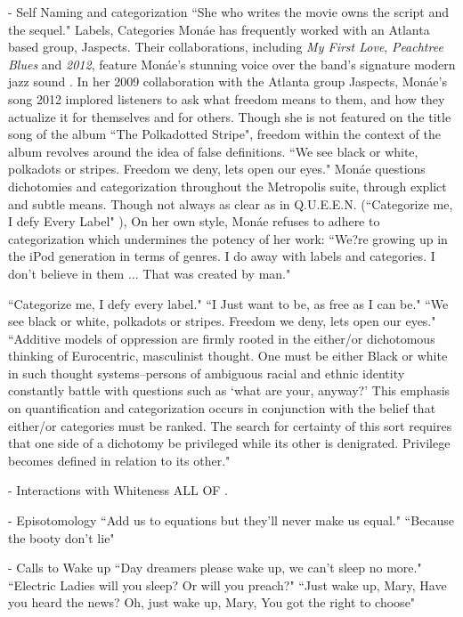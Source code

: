 \documentclass[a4paper, 11pt]{article} %
\begin{document}
- Self Naming and categorization
``She who writes the movie owns the script and the sequel." \cite{queen}
Labels, Categories
Mon\'ae has frequently worked with an Atlanta based group, Jaspects.
Their collaborations, including \emph{My First Love}, \emph{Peachtree Blues} and \emph{2012}, feature Mon\'ae's stunning voice over the band's signature modern jazz sound \cite{peachtreeblues} \cite{myfirstlove}.
In her 2009 collaboration with the Atlanta group Jaspects, Mon\'ae's song 2012 implored listeners to ask what freedom means to them, and how they actualize it for themselves and for others.
Though she is not featured on the title song of the album ``The Polkadotted Stripe", freedom within the context of the album revolves around the idea of false definitions.
``We see black or white, polkadots or stripes. Freedom we deny, lets open our eyes." \cite{polkadottedstripe}
Mon\'ae questions dichotomies and categorization throughout the Metropolis suite, through explict and subtle means.
Though not always as clear as in Q.U.E.E.N. (``Categorize me, I defy Every Label" \cite{queen}), 
On her own style, Mon\'ae refuses to adhere to categorization which undermines the potency of her work:
``We?re growing up in the iPod generation in terms of genres. I do away with labels and categories. I don't believe in them ... That was created by man." \cite{joeyguerra2010}


``Categorize me, I defy every label." \cite{queen}
``I Just want to be, as free as I can be." \cite{polkadottedstripe}
``We see black or white, polkadots or stripes. Freedom we deny, lets open our eyes." \cite{polkadottedstripe}
``Additive models of oppression are firmly rooted in the either/or dichotomous thinking of Eurocentric, masculinist thought. One must be either Black or white in such thought systems--persons of ambiguous racial and ethnic identity constantly battle with questions such as `what are your, anyway?' This emphasis on quantification and categorization occurs in conjunction with the belief that either/or categories must be ranked. The search for certainty of this sort requires that one side of a dichotomy be privileged while its other is denigrated. Privilege becomes defined in relation to its other." \cite{collins2009}


- Interactions with Whiteness
ALL OF \cite{favoritefugitive}.

- Episotomology
``Add us to equations but they'll never make us equal." \cite{queen}
``Because the booty don't lie" \cite{queen}

- Calls to Wake up
``Day dreamers please wake up, we can't sleep no more." \cite{sincerelyjane}
``Electric Ladies will you sleep? Or will you preach?" \cite{queen}
``Just wake up, Mary, Have you heard the news? Oh, just wake up, Mary, You got the right to choose" \cite{sallyride}
\end{document}
